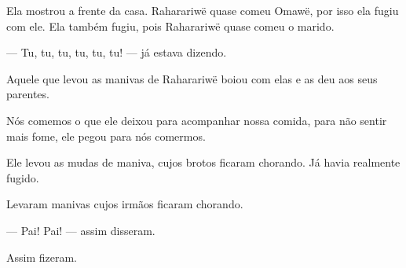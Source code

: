 Ela mostrou a frente da casa. Raharariwë quase comeu Omawë, por isso ela
fugiu com ele. Ela também fugiu, pois Raharariwë quase comeu o marido. 

--- Tu, tu, tu, tu, tu, tu! --- já estava dizendo. 

Aquele que levou as manivas de Raharariwë boiou com elas e as deu aos
seus parentes. 

Nós comemos o que ele deixou para acompanhar nossa comida, para não
sentir mais fome, ele pegou para nós comermos. 

Ele levou as mudas de maniva, cujos brotos ficaram chorando. Já havia
realmente fugido. 

Levaram manivas cujos irmãos ficaram chorando. 

--- Pai! Pai! --- assim disseram. 

Assim fizeram.

 
